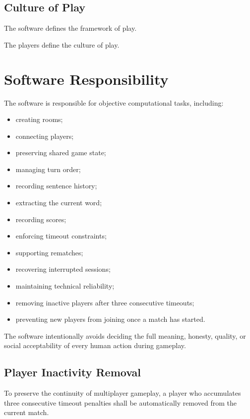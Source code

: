 \documentclass[11pt,a4paper]{article}
\begin{document}
\subsection{Culture of Play}

The software defines the framework of play.

The players define the culture of play.

\section{Software Responsibility}

The software is responsible for objective computational tasks, including:

\begin{itemize}
    \item creating rooms;
    \item connecting players;
    \item preserving shared game state;
    \item managing turn order;
    \item recording sentence history;
    \item extracting the current word;
    \item recording scores;
    \item enforcing timeout constraints;
    \item supporting rematches;
    \item recovering interrupted sessions;
    \item maintaining technical reliability;

    \item removing inactive players after three consecutive timeouts;
    \item preventing new players from joining once a match has started.
    
\end{itemize}

The software intentionally avoids deciding the full meaning, honesty, quality, or social acceptability of every human action during gameplay.

\subsection{Player Inactivity Removal}

To preserve the continuity of multiplayer gameplay, a player who accumulates three consecutive timeout penalties shall be automatically removed from the current match.
\end{document}
